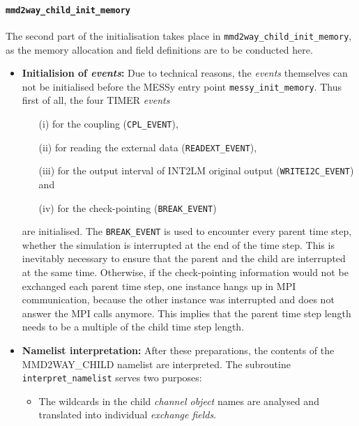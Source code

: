 \documentclass[11pt,twoside]{article}
\begin{document}
\paragraph{\tt \bf mmd2way\_child\_init\_memory\\}


The second part of the initialisation takes place
in \verb|mmd2way_child_init_memory|, 
as the memory allocation and field definitions are to be conducted here.
\begin{itemize} %
\item {\bf Initialision of \textit{events}:} Due to technical reasons, the {\it events} themselves can not be 
initialised before the MESSy entry point \verb|messy_init_memory|. Thus first of
 all, the four TIMER {\it events} 
\begin{itemize} 
\item[ (i)] for the coupling (\verb|CPL_EVENT|),
\item[(ii)] for reading the external data (\verb|READEXT_EVENT|),
\item[(iii)] for the output interval of INT2LM original output
 (\verb|WRITEI2C_EVENT|)  and 
\item[(iv)] for the check-pointing
 (\verb|BREAK_EVENT|)
\end{itemize}
 are initialised. 
The \verb|BREAK_EVENT| is used to encounter every parent time
 step, whether the 
simulation is interrupted at the end of the time step.  This is inevitably 
necessary to ensure that the parent and the child are interrupted  at
 the same time.  
Otherwise, if the check-pointing information would not be exchanged each parent
time step, one instance hangs up in MPI communication, because the
other instance was interrupted and does not answer the MPI calls anymore.
This implies that the parent time step length needs to be a multiple
of the child time step length.

\item {\bf Namelist interpretation:} After these preparations, the
 contents of the MMD2WAY\_CHILD namelist are 
 interpreted. The subroutine \verb|interpret_namelist| serves two purposes:
\begin{itemize} %
\item The wildcards in the child {\it channel object} names are analysed
and translated into individual {\it exchange fields}.


\end{itemize}
\end{itemize}
\end{document}
